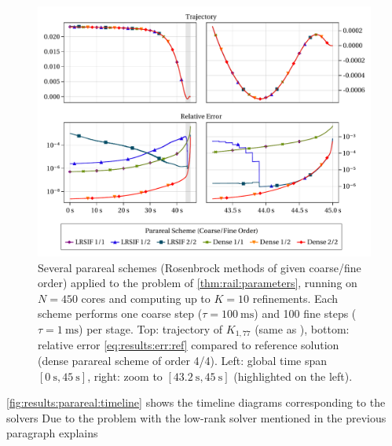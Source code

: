 \begin{figure}[t]
  \centering
  \includegraphics[width=\textwidth]{figures/fig_results_parareal.pdf}
  \caption[Parareal method applied to Rail problem]{%
    Several parareal schemes (Rosenbrock methods of given coarse/fine order)
    applied to the problem of \autoref{thm:rail:parameters},
    running on $N=450$ cores and
    computing up to $K=10$ refinements.
    Each scheme performs
    one coarse step ($\tau=\SI{100}{\milli\second}$) and
    100 fine steps ($\tau=\SI{1}{\milli\second}$) per stage.
    Top: trajectory of $K_{1,77}$ (same as \cite[Fig.~1]{Lang2015}),
    bottom: relative error \eqref{eq:results:err:ref} compared to reference solution
    (dense parareal scheme of order 4/4).
    Left: global time span $[\SI{0}{\second}, \SI{45}{\second}]$,
    right: zoom to $[\SI[round-mode=off]{43.2}{\second}, \SI{45}{\second}]$ (highlighted on the left).
  }
  \label{fig:results:parareal:rail}
\end{figure}

\autoref{fig:results:parareal:timeline} shows the timeline diagrams corresponding to the solvers
Due to the problem with the low-rank  solver mentioned in the previous paragraph explains

